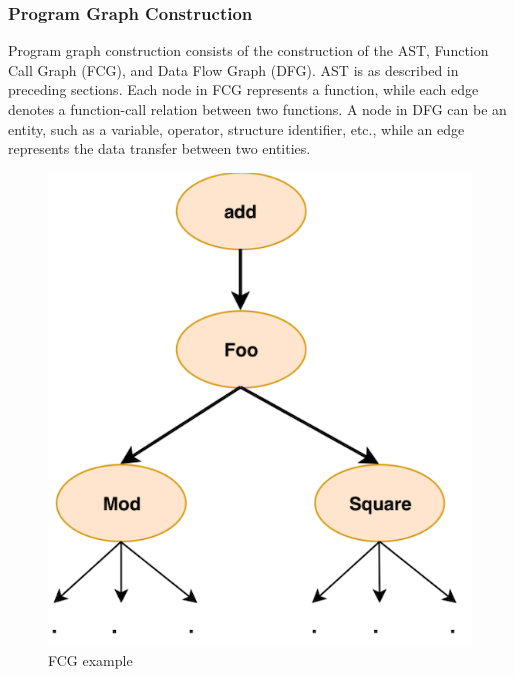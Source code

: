 \documentclass{article}
\begin{document}
\subsubsection{Program Graph Construction}
Program graph construction consists of the construction of the AST, Function Call Graph (FCG), and Data Flow Graph (DFG).
AST is as described in preceding sections. Each node in FCG represents a function, while each edge denotes a function-call relation between two functions.
A node in DFG can be an entity, such as a variable, operator, structure identifier, etc., while an edge represents the data transfer between two entities.
\begin{figure}[ht]
    \centerline{\includegraphics[width=\columnwidth]{Images/Similarity2-5a.png}}
    \caption{FCG example}
\end{figure}
\end{document}
